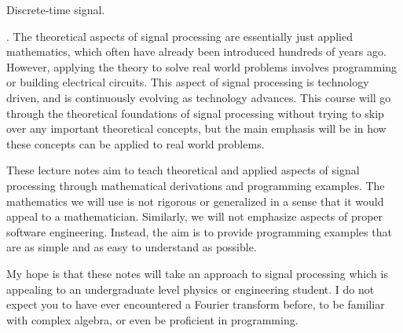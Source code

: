 \begin{marginfigure}%
	\begin{center}
	\end{center}
	\caption{Discrete-time signal.}
	\label{fig:dtfig_intro}
\end{marginfigure}

. The theoretical
aspects of signal processing are essentially just applied mathematics,
which often have already been introduced hundreds of years
ago. However, applying the theory to solve real world problems
involves programming or building electrical circuits. This aspect
of signal processing is technology driven, and is continuously
evolving as technology advances. This course will go through the theoretical foundations of signal processing without trying to skip over any important theoretical concepts, but the main emphasis will be in how these concepts can be applied to real world problems.

These lecture notes aim to teach theoretical and applied aspects of signal
processing through mathematical derivations and programming
examples. The mathematics we will use is not rigorous or generalized
in a sense that it would appeal to a mathematician. Similarly, we will
not emphasize aspects of proper software engineering. Instead, the aim
is to provide programming examples that are as simple and as easy to
understand as possible.

My hope is that these notes will take an approach to signal processing
which is appealing to an undergraduate level physics or engineering
student. I do not expect you to have ever encountered a Fourier
transform before, to be familiar with complex algebra, or even be
proficient in programming.

